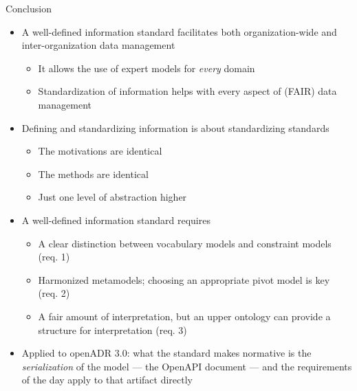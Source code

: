 \begin{frame}{Conclusion}

    \begin{itemize}
        \item A well-defined information standard facilitates both organization-wide and inter-organization data management
        \begin{itemize}
            \item It allows the use of expert models for \textit{every} domain
            \item Standardization of information helps with every aspect of (FAIR) data management
        \end{itemize}
        \item Defining and standardizing information is about standardizing standards
        \begin{itemize}
            \item The motivations are identical
            \item The methods are identical
            \item Just one level of abstraction higher
        \end{itemize}
        \item A well-defined information standard requires
        \begin{itemize}

            \item A clear distinction between vocabulary models and constraint models (req. 1)
            \item Harmonized metamodels; choosing an appropriate pivot model is key (req. 2)
            \item A fair amount of interpretation, but an upper ontology can provide a structure for interpretation (req. 3)
        \end{itemize}
        \item Applied to openADR 3.0: what the standard makes normative is the \emph{serialization} of the model
        — the OpenAPI document — and the requirements of the day apply to that artifact directly
    \end{itemize}
\end{frame}

